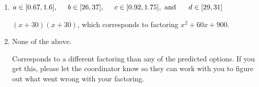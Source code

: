 \documentclass{extbook}[14pt]
\begin{document}
\begin{enumerate}
{\begin{enumerate}[label=\Alph*.]
* $(6x + 5)(6x + 5)$, which is the correct option.
\item \( a \in [0.67, 1.6], \hspace*{5mm} b \in [26, 37], \hspace*{5mm} c \in [0.92, 1.75], \text{ and } \hspace*{5mm} d \in [29, 31] \)

 $(x + 30)(x + 30)$, which corresponds to factoring $x^{2} +60 x + 900$.
\item \( \text{None of the above.} \)

 Corresponds to a different factoring than any of the predicted options. If you get this, please let the coordinator know so they can work with you to figure out what went wrong with your factoring.
\end{enumerate}

}
\end{enumerate}
\end{document}
